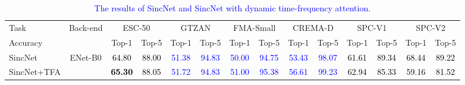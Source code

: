 \begin{table*}[!t]
\centering
    \small
    \def\arraystretch{1.2}
    \setlength{\tabcolsep}{2.3pt}
    \setlength{\abovetopsep}{0pt}
    \setlength\belowbottomsep{0pt} 
    \setlength\aboverulesep{0pt} 
    \setlength\belowrulesep{0pt}
\caption{\textcolor{blue}{The results of SincNet and SincNet with dynamic time-frequency attention.}}
\begin{tabular}{l|c|cc|cc|cc|cc|cc|cc}
\toprule
Task & \multirow{2}{*}{Back-end} & \multicolumn{2}{c|}{ESC-50} & \multicolumn{2}{c|}{GTZAN} &  \multicolumn{2}{c|}{FMA-Small} & \multicolumn{2}{c|}{CREMA-D} & \multicolumn{2}{c|}{SPC-V1} & \multicolumn{2}{c}{SPC-V2} \\
\cline{3-14}
Accuracy & & Top-1 & Top-5 & Top-1 & Top-5 & Top-1 & Top-5 & Top-1 & Top-5 & Top-1 & Top-5 & Top-1 & Top-5 \\
\hline
\hline
SincNet & \multirow{2}{*}{ENet-B0} &
\textcolor{black}{64.80} & \textcolor{black}{88.00} & \textcolor{blue}{51.38} & \textcolor{blue}{94.83} & \textcolor{blue}{50.00} & \textcolor{blue}{94.75} & \textcolor{blue}{53.43} & \textcolor{blue}{98.07} & \textcolor{black}{61.61} & \textcolor{black}{89.34} & \textcolor{black}{68.44} & \textcolor{black}{89.22} \\

SincNet+TFA & & 
\textbf{\textcolor{black}{65.30}}  & \textcolor{black}{88.05} & \textcolor{blue}{51.72}  & \textcolor{blue}{94.83} & \textcolor{blue}{51.00} & \textcolor{blue}{95.38} & \textcolor{blue}{56.61} & \textcolor{blue}{99.23} & \textcolor{black}{62.94}  &  \textcolor{black}{85.33}  & \textcolor{black}{59.16} & \textcolor{black}{81.52} \\



\toprule
\end{tabular}
\label{ablation}
\end{table*}